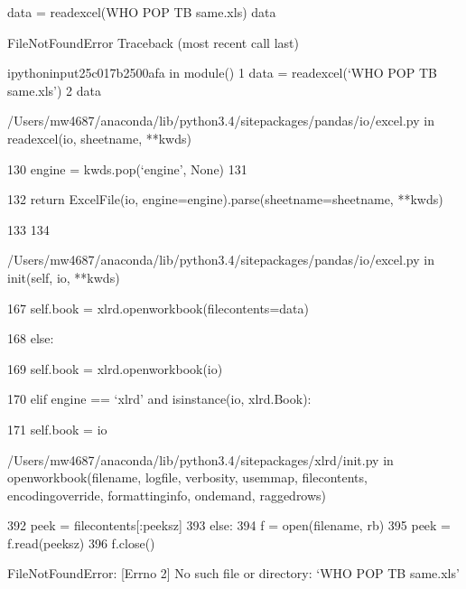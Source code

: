 \documentclass[letterpaper,10pt,english]{sphinxmanual}
\begin{document}
{
\begin{sphinxVerbatim}[commandchars=\\\{\}]
\llap{\color{nbsphinxin}[ ]:\,\hspace{\fboxrule}\hspace{\fboxsep}}
data = read\PYGZus{}excel(\PYGZsq{}WHO POP TB same.xls\PYGZsq{})
data


\PYGZhy{}\PYGZhy{}\PYGZhy{}\PYGZhy{}\PYGZhy{}\PYGZhy{}\PYGZhy{}\PYGZhy{}\PYGZhy{}\PYGZhy{}\PYGZhy{}\PYGZhy{}\PYGZhy{}\PYGZhy{}\PYGZhy{}\PYGZhy{}\PYGZhy{}\PYGZhy{}\PYGZhy{}\PYGZhy{}\PYGZhy{}\PYGZhy{}\PYGZhy{}\PYGZhy{}\PYGZhy{}\PYGZhy{}\PYGZhy{}\PYGZhy{}\PYGZhy{}\PYGZhy{}\PYGZhy{}\PYGZhy{}\PYGZhy{}\PYGZhy{}\PYGZhy{}\PYGZhy{}\PYGZhy{}\PYGZhy{}\PYGZhy{}\PYGZhy{}\PYGZhy{}\PYGZhy{}\PYGZhy{}\PYGZhy{}\PYGZhy{}

FileNotFoundError Traceback (most recent call last)

\PYGZlt{}ipython\PYGZhy{}input\PYGZhy{}25\PYGZhy{}c017b2500afa\PYGZgt{} in \PYGZlt{}module\PYGZgt{}()
\PYGZhy{}\PYGZhy{}\PYGZhy{}\PYGZhy{}\PYGZgt{} 1 data = read\PYGZus{}excel(‘WHO POP TB same.xls’)
2 data



/Users/mw4687/anaconda/lib/python3.4/site\PYGZhy{}packages/pandas/io/excel.py in read\PYGZus{}excel(io, sheetname, **kwds)

130 engine = kwds.pop(‘engine’, None)
131

\PYGZhy{}\PYGZhy{}\PYGZgt{} 132 return ExcelFile(io, engine=engine).parse(sheetname=sheetname, **kwds)

133
134



/Users/mw4687/anaconda/lib/python3.4/site\PYGZhy{}packages/pandas/io/excel.py in \PYGZus{}\PYGZus{}init\PYGZus{}\PYGZus{}(self, io, **kwds)


167 self.book = xlrd.open\PYGZus{}workbook(file\PYGZus{}contents=data)

168 else:

\PYGZhy{}\PYGZhy{}\PYGZgt{} 169 self.book = xlrd.open\PYGZus{}workbook(io)


170 elif engine == ‘xlrd’ and isinstance(io, xlrd.Book):

171 self.book = io



/Users/mw4687/anaconda/lib/python3.4/site\PYGZhy{}packages/xlrd/\PYGZus{}\PYGZus{}init\PYGZus{}\PYGZus{}.py in open\PYGZus{}workbook(filename, logfile,
 verbosity, use\PYGZus{}mmap, file\PYGZus{}contents, encoding\PYGZus{}override, formatting\PYGZus{}info, on\PYGZus{}demand, ragged\PYGZus{}rows)

392 peek = file\PYGZus{}contents[:peeksz]
393 else:
\PYGZhy{}\PYGZhy{}\PYGZgt{} 394 f = open(filename, \PYGZdq{}rb\PYGZdq{})
395 peek = f.read(peeksz)
396 f.close()



FileNotFoundError: [Errno 2] No such file or directory: ‘WHO POP TB same.xls’

\end{sphinxVerbatim}
}
\end{document}
